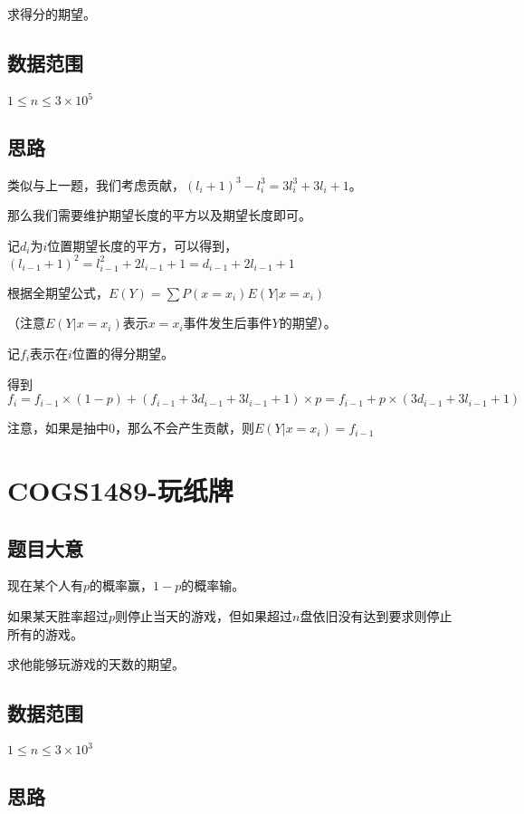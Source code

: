 \documentclass{ctexart}
\numberwithin{equation}{section}
\begin{document}
\begin{flushleft}
  求得分的期望。

  \subsection{数据范围}
  $1\le n \le 3\times 10^5$
  \subsection{思路}
  
  类似与上一题，我们考虑贡献，$(l_i+1)^3-l^3_i=3l_i^3+3l_i+1$。

  那么我们需要维护期望长度的平方以及期望长度即可。

  记$d_i$为$i$位置期望长度的平方，可以得到，$(l_{i-1}+1)^2=l_{i-1}^2+2l_{i-1}+1=d_{i-1}+2l_{i-1}+1$

  根据全期望公式，$E(Y)=\sum P(x=x_i)E(Y|x=x_i)$

  （注意$E(Y|x=x_i)$表示$x=x_i$事件发生后事件$Y$的期望）。

  记$f_i$表示在$i$位置的得分期望。
  
  得到$$f_i=f_{i-1}\times (1-p)+(f_{i-1}+3d_{i-1}+3l_{i-1}+1)\times p=f_{i-1}+p\times (3d_{i-1}+3l_{i-1}+1)$$

  注意，如果是抽中$0$，那么不会产生贡献，则$E(Y|x=x_i)=f_{i-1}$
  \newpage

  \section{COGS1489-玩纸牌}
  \subsection{题目大意}
  现在某个人有$p$的概率赢，$1-p$的概率输。

  如果某天胜率超过$p$则停止当天的游戏，但如果超过$n$盘依旧没有达到要求则停止所有的游戏。

  求他能够玩游戏的天数的期望。

  \subsection{数据范围}
  $1\le n \le 3\times 10^3$
  \subsection{思路}
  

\end{flushleft}
\end{document}
